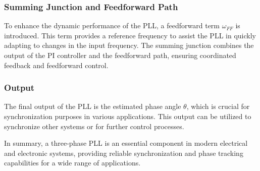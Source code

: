 \subsubsection{Summing Junction and Feedforward Path}
To enhance the dynamic performance of the PLL, a feedforward term
\(\omega_{FF}\) is introduced. This term provides a reference frequency to
assist the PLL in quickly adapting to changes in the input frequency. The
summing junction combines the output of the PI controller and the feedforward
path, ensuring coordinated feedback and feedforward control.

\subsubsection{Output}
The final output of the PLL is the estimated phase angle \(\theta\), which is
crucial for synchronization purposes in various applications. This output can
be utilized to synchronize other systems or for further control processes.

In summary, a three-phase PLL is an essential component in modern electrical
and electronic systems, providing reliable synchronization and phase tracking
capabilities for a wide range of applications.
